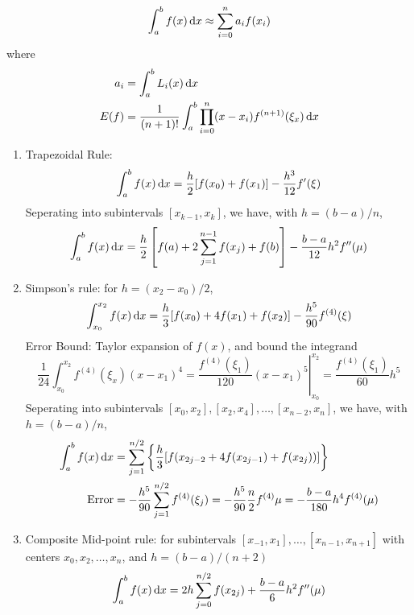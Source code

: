 \begin{definition}
\[
\int_a^bf(x)\,\mathrm{d} x\approx\sum_{i=0}^na_if(x_i)
\]
where
\begin{align*}
a_i&=\int_a^bL_i(x)\,\mathrm{d} x\\
E(f)&=\frac{1}{(n+1)!}\int_a^b\prod_{i=0}^n(x-x_i)f^{(n+1)}(\xi_x)\,\mathrm{d} x
\end{align*}
\end{definition}
\begin{enumerate}
\item
Trapezoidal Rule:
\[
\int_a^bf(x)\,\mathrm{d} x=\frac{h}{2}[f(x_0)+f(x_1)]-\frac{h^3}{12}f'(\xi)
\]
Seperating into subintervals $[x_{k-1},x_k]$, we have, with $h=(b-a)/n$,
\[
\int_a^bf(x)\,\mathrm{d} x=\frac{h}{2}\left[f(a)+2\sum_{j=1}^{n-1}f(x_j)+f(b)\right]-\frac{b-a}{12}h^2f''(\mu)
\]
\item
Simpson's rule: for $h=(x_2-x_0)/2$,
\[
\int_{x_0}^{x_2}f(x)\,\mathrm{d} x=\frac{h}{3}[f(x_0)+4f(x_1)+f(x_2)]-\frac{h^5}{90}f^{(4)}(\xi)
\]
Error Bound: Taylor expansion of $f(x)$, and bound the integrand
\[
\frac{1}{24}\int_{x_0}^{x_2}f^{(4)}(\xi_x)(x-x_1)^4=\left.\frac{f^{(4)}(\xi_1)}{120}(x-x_1)^5\right|_{x_0}^{x_2}=\frac{f^{(4)}(\xi_1)}{60}h^5
\]
Seperating into subintervals $[x_0,x_2],[x_2,x_4],\dots,[x_{n-2},x_n]$, we have, with $h=(b-a)/n$,
\begin{align*}
\int_a^bf(x)\,\mathrm{d} x&=\sum_{j=1}^{n/2}\left\{\frac{h}{3}[f(x_{2j-2}+4f(x_{2j-1})+f(x_{2j}))]\right\}\\
\mbox{Error}&=-\frac{h^5}{90}\sum_{j=1}^{n/2}f^{(4)}(\xi_j)
=
-\frac{h^5}{90}\frac{n}{2}f^{(4)}\mu=-\frac{b-a}{180}h^4f^{(4)}(\mu)
\end{align*}
\item
Composite Mid-point rule: for subintervals $[x_{-1},x_1],\dots,[x_{n-1},x_{n+1}]$ with centers $x_0,x_2,\dots,x_n$, and $h=(b-a)/(n+2)$
\[
\int_a^bf(x)\,\mathrm{d} x=2h\sum_{j=0}^{n/2}f(x_{2j})+\frac{b-a}{6}h^2f''(\mu)
\]
\end{enumerate}


